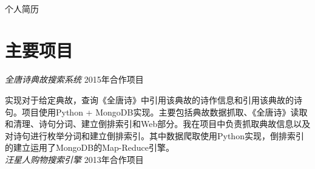 \documentclass[10pt]{article} %
\begin{document}
\color{text1} %


\par{\\ %
{\color{headings} 个人简历 \\[15pt]\par} %
	

\begin{minipage}[t]{0.5\textwidth} %
\vspace{0pt} %
	

\section{主要项目} 


{\large \textit{全唐诗典故搜索系统}} \hfill  \hfill {\textsc{2015年\quad 合作项目}\\}

\normalsize{实现对于给定典故，查询《全唐诗》中引用该典故的诗作信息和引用该典故的诗句。项目使用Python +
 MongoDB实现。主要包括典故数据抓取、《全唐诗》读取和清理、诗句分词、建立倒排索引和Web部分。我在项目中负责抓取典故信息以及对诗句进行枚举分词和建立倒排索引。其中数据爬取使用Python实现，倒排索引的建立运用了MongoDB的Map-Reduce引擎。}\\

{\large \textit{汪星人购物搜索引擎}} \hfill  \hfill {\textsc{2013年\quad 合作项目}\\}


\end{minipage}}
\end{document}
